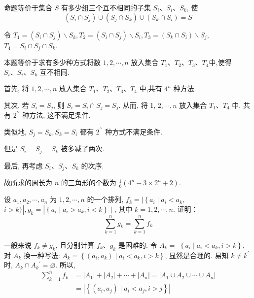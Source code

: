\begin{analysis}
	命题等价于集合 $S$ 有多少组三个互不相同的子集 $S_{i} 、 S_{i} 、 S_{k}$, 使
	$$
		\left(S_{i} \cap S_{j}\right) \cup\left(S_{j} \cap S_{k}\right) \cup\left(S_{k} \cap S_{i}\right)=S
	$$
\end{analysis}

\begin{solution}
	令 $T_{1}=\left(S_{i} \cap S_{j}\right) \backslash S_{k}, T_{2}=\left(S_{i} \cap S_{j}\right) \backslash S_{i}, T_{3}=\left(S_{k} \cap S_{i}\right) \backslash S_{j}$, $T_{4}=S_{i} \cap S_{j} \cap S_{k}$.

	本题等价于求有多少种方式将数 $1,2, \cdots, n$ 放入集合 $T_{1} 、 T_{2} 、 T_{3} 、 T_{4}$中,使得 $S_{i} 、 S_{i} 、 S_{k}$ 互不相同.

	首先, 将 $1,2, \cdots, n$ 放入集合 $T_{1} 、 T_{2} 、 T_{3} 、 T_{4}$ 中,共有 $4^{n}$ 种方法.

	其次, 若 $S_{i}=S_{j}$, 则 $S_{i}=S_{i} \cap S_{j}=S_{j}$. 从而, 将 1, $2, \cdots, n$ 放入集合 $T_{1} 、 T_{4}$ 中, 共有 $2^{\prime \prime}$ 种方法, 这不满足条件.

	类似地, $S_{j}=S_{k}, S_{k}=S_{i}$ 都有 $2^{\prime \prime}$ 种方式不满足条件.

	但是 $S_{i}=S_{j}=S_{k}$ 被多减了两次.

	最后, 再考虑 $S_{i} 、 S_{j} 、 S_{k}$ 的次序.

	故所求的周长为 $n$ 的三角形的个数为 $\frac{1}{6}\left(4^{n}-3 \times 2^{n}+2\right)$.
\end{solution}

\begin{example}
	设 $a_{1}, a_{2}, \cdots, a_{n}$ 为 $1,2, \cdots, n$ 的一个排列, $f_{k}=\mid\left\{a_{i} \mid a_{i}<a_{k}\right.$, $i>k\}\left|, g_{k}=\right|\left\{a_{i} \mid a_{i}>a_{k}, i<k\right\} \mid$, 其中 $k=1,2, \cdots, n$. 证明：
	$$
		\sum_{k=1}^{n} g_{k}=\sum_{k=1}^{n} f_{k}
	$$
\end{example}

\begin{analysis}
	一般来说 $f_{k} \neq g_{k}$, 且分别计算 $f_{k} 、 g_{k}$ 是困难的. 令 $A_{k}=$ $\left\{a_{i} \mid a_{i}<a_{k}, i>k\right\}$, 对 $A_{k}$ 换一种写法: $A_{k}=\left\{\left(a_{i}, a_{k}\right) \mid a_{i}<a_{k}, i>k\right\}$, 显然是合理的. 易知 $k \neq k^{\prime}$ 时, $A_{k} \cap A_{k}{ }^{\prime}=\varnothing$. 所以,
	$$
		\begin{aligned}
			\sum_{k=1}^{n} f_{k} & =\left|A_{1}\right|+\left|A_{2}\right|+\cdots+\left|A_{n}\right|=\left|A_{1} \cup A_{2} \cup \cdots \cup A_{n}\right| \\
			                     & =\left|\left\{\left(a_{i}, a_{j}\right) \mid a_{i}<a_{j}, i>j\right\}\right|
		\end{aligned}
	$$
\end{analysis}

